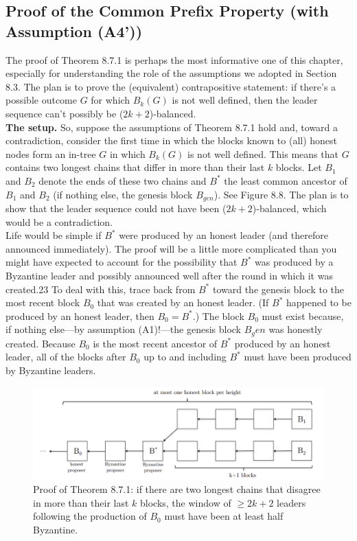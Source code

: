 \subsection{Proof of the Common Prefix Property (with Assumption (A4’))}
The proof of Theorem 8.7.1 is perhaps the most informative one of this chapter, especially for
understanding the role of the assumptions we adopted in Section 8.3. The plan is to prove
the (equivalent) contrapositive statement: if there’s a possible outcome $G$ for which $B_k(G)$
is not well defined, then the leader sequence can’t possibly be ($2k + 2$)-balanced.\\

\noindent
\textbf{The setup.} So, suppose the assumptions of Theorem 8.7.1 hold and, toward a contradiction,
consider the first time in which the blocks known to (all) honest nodes form an in-tree $G$ in
which $B_k(G)$ is not well defined. This means that $G$ contains two longest chains that differ in
more than their last $k$ blocks. Let $B_1$ and $B_2$ denote the ends of these two chains and $B^*$
the
least common ancestor of $B_1$ and $B_2$ (if nothing else, the genesis block $B_{gen}$). See Figure 8.8.
The plan is to show that the leader sequence could not have been ($2k + 2$)-balanced, which
would be a contradiction.\\

Life would be simple if $B^*$ were produced by an honest leader (and therefore announced
immediately). The proof will be a little more complicated than you might have expected
to account for the possibility that $B^*$ was produced by a Byzantine leader and possibly
announced well after the round in which it was created.23 To deal with this, trace back
from $B^*$
toward the genesis block to the most recent block $B_0$ that was created by an
honest leader. (If $B^*$ happened to be produced by an honest leader, then $B_0 = B^*$.) The
block $B_0$ must exist because, if nothing else—by assumption (A1)!—the genesis block $B_gen$
was honestly created. Because $B_0$ is the most recent ancestor of $B^*$ produced by an honest
leader, all of the blocks after $B_0$ up to and including $B^*$ must have been produced by
Byzantine leaders.
\begin{figure}[h]
    \centering
    \includegraphics[scale = 0.5]{figures/f29.png}
    \caption{Proof of Theorem 8.7.1: if there are two longest chains that disagree in more than
their last $k$ blocks, the window of $ \geq 2k + 2$ leaders following the production of $B_0$ must have
been at least half Byzantine.
}
    \label{fig:mesh1}
\end{figure}\\

